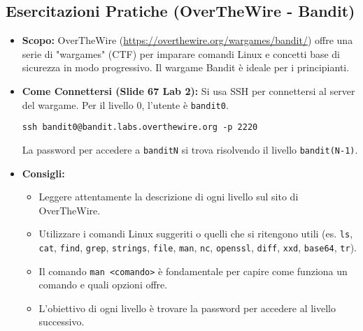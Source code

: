 \subsection{Esercitazioni Pratiche (OverTheWire - Bandit)}
\begin{itemize}
    \item \textbf{Scopo:} OverTheWire (\url{https://overthewire.org/wargames/bandit/}) offre una serie di "wargames" (CTF) per imparare comandi Linux e concetti base di sicurezza in modo progressivo. Il wargame Bandit è ideale per i principianti.
    \item \textbf{Come Connettersi (Slide 67 Lab 2):}
    Si usa SSH per connettersi al server del wargame. Per il livello 0, l'utente è \texttt{bandit0}.
\begin{verbatim}
ssh bandit0@bandit.labs.overthewire.org -p 2220
\end{verbatim}
    La password per accedere a \texttt{banditN} si trova risolvendo il livello \texttt{bandit(N-1)}.
    \item \textbf{Consigli:}
    \begin{itemize}
        \item Leggere attentamente la descrizione di ogni livello sul sito di OverTheWire.
        \item Utilizzare i comandi Linux suggeriti o quelli che si ritengono utili (es. \texttt{ls}, \texttt{cat}, \texttt{find}, \texttt{grep}, \texttt{strings}, \texttt{file}, \texttt{man}, \texttt{nc}, \texttt{openssl}, \texttt{diff}, \texttt{xxd}, \texttt{base64}, \texttt{tr}).
        \item Il comando \texttt{man <comando>} è fondamentale per capire come funziona un comando e quali opzioni offre.
        \item L'obiettivo di ogni livello è trovare la password per accedere al livello successivo.
    \end{itemize}
\end{itemize}

